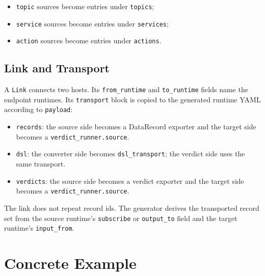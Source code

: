 \documentclass[11pt]{article}
\begin{document}
\begin{itemize}
  \item \texttt{topic} sources become entries under \texttt{topics};
  \item \texttt{service} sources become entries under \texttt{services};
  \item \texttt{action} sources become entries under \texttt{actions}.
\end{itemize}

\subsection{Link and Transport}

A \texttt{Link} connects two hosts. Its \texttt{from\_runtime} and
\texttt{to\_runtime} fields name the endpoint runtimes. Its
\texttt{transport} block is copied to the generated runtime YAML according to
\texttt{payload}:

\begin{itemize}
  \item \texttt{records}: the source side becomes a DataRecord exporter and the
        target side becomes a \texttt{verdict\_runner.source}.
  \item \texttt{dsl}: the converter side becomes \texttt{dsl\_transport}; the
        verdict side uses the same transport.
  \item \texttt{verdicts}: the source side becomes a verdict exporter and the
        target side becomes a \texttt{verdict\_runner.source}.
\end{itemize}

The link does not repeat record ids. The generator derives the transported
record set from the source runtime's \texttt{subscribe} or \texttt{output\_to}
field and the target runtime's \texttt{input\_from}.

\clearpage
\section{Concrete Example}
\end{document}
